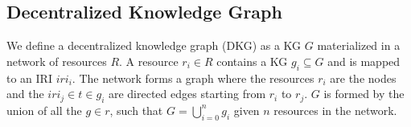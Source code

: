 \subsection{Decentralized Knowledge Graph}
We define a decentralized knowledge graph (DKG) as a KG $G$ materialized in a network of resources $R$.
A resource $r_i \in R$ contains a KG $g_i \subseteq G$ and is mapped  to an IRI $iri_i$.
The network forms a graph where the resources $r_i$ are the nodes and the $iri_j \in t \in g_i$ are directed edges starting from $r_i$ to $r_j$.
$G$ is formed by the union of all the $g \in r$, such that $G = \bigcup_{i=0}^{n}g_i$ given $n$ resources in the network.